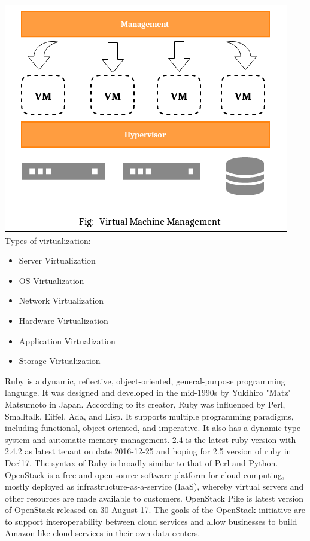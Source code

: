 \documentclass[a4paper,12pt]{report}
\begin{document}
\includegraphics[scale=.85]{vm_management}\\

Types of virtualization:
\begin{itemize}
	\item Server Virtualization
	\item OS Virtualization
	\item Network Virtualization
	\item Hardware Virtualization
	\item Application Virtualization
	\item Storage Virtualization
\end{itemize}

Ruby is a dynamic, reflective, object-oriented, general-purpose programming language. It was designed and developed in the mid-1990s by Yukihiro "Matz" Matsumoto in Japan. According to its creator, Ruby was influenced by Perl, Smalltalk, Eiffel, Ada, and Lisp. It supports multiple programming paradigms, including functional, object-oriented, and imperative. It also has a dynamic type system and automatic memory management. 2.4 is the latest ruby version with 2.4.2 as latest tenant on date 2016-12-25 and hoping for 2.5 version of ruby in Dec'17. The syntax of Ruby is broadly similar to that of Perl and Python.\\

OpenStack is a free and open-source software platform for cloud computing, mostly deployed as infrastructure-as-a-service (IaaS), whereby virtual servers and other resources are made available to customers. OpenStack Pike is latest version of OpenStack released on 30 August 17. The goals of the OpenStack initiative are to support interoperability between cloud services and allow businesses to build Amazon-like cloud services in their own data centers.\\
\end{document}
